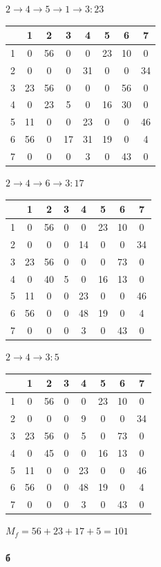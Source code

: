 \documentclass[russian]{article}
\begin{document}
$ 2 \to 4 \to 5 \to 1 \to 3 : 23$

\begin{tabular}{|c|c|c|c|c|c|c|c|}\hline
& 1& 2& 3& 4& 5& 6& 7\\\hline
1&0&56&0&0&23&10&0\\\hline
2&0&0&0&31&0&0&34\\\hline
3&23&56&0&0&0&56&0\\\hline
4&0&23&5&0&16&30&0\\\hline
5&11&0&0&23&0&0&46\\\hline
6&56&0&17&31&19&0&4\\\hline
7&0&0&0&3&0&43&0\\\hline
\end{tabular}

$ 2 \to 4 \to 6 \to 3 : 17$

\begin{tabular}{|c|c|c|c|c|c|c|c|}\hline
& 1& 2& 3& 4& 5& 6& 7\\\hline
1&0&56&0&0&23&10&0\\\hline
2&0&0&0&14&0&0&34\\\hline
3&23&56&0&0&0&73&0\\\hline
4&0&40&5&0&16&13&0\\\hline
5&11&0&0&23&0&0&46\\\hline
6&56&0&0&48&19&0&4\\\hline
7&0&0&0&3&0&43&0\\\hline
\end{tabular}

$ 2 \to 4 \to 3 : 5$

\begin{tabular}{|c|c|c|c|c|c|c|c|}\hline
& 1& 2& 3& 4& 5& 6& 7\\\hline
1&0&56&0&0&23&10&0\\\hline
2&0&0&0&9&0&0&34\\\hline
3&23&56&0&5&0&73&0\\\hline
4&0&45&0&0&16&13&0\\\hline
5&11&0&0&23&0&0&46\\\hline
6&56&0&0&48&19&0&4\\\hline
7&0&0&0&3&0&43&0\\\hline
\end{tabular}

$M_f=56+23+17+5=101$

\paragraph*{б}
\end{document}
